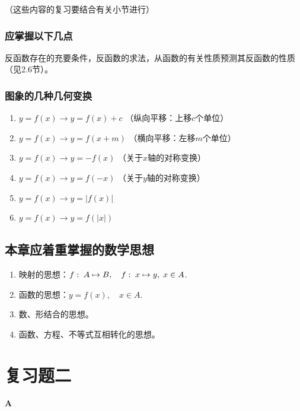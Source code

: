 （这些内容的复习要结合有关小节进行）

\subsubsection{应掌握以下几点}
反函数存在的充要条件，反函数的求法，从函数的有关性质预测其反函数的性质（见2.6节）。


\subsubsection{图象的几种几何变换}
\begin{enumerate}
    \item $y=f(x)\longrightarrow y=f(x)+c$
   \hfill （纵向平移：上移$c$个单位）
    \item $y=f(x)\longrightarrow y=f(x+m)$
    \hfill   （横向平移：左移$m$个单位）
    \item $y=f(x)\longrightarrow y=-f(x)$
    \hfill   （关于$x$轴的对称变换）
    \item $y=f(x)\longrightarrow y=f(-x)$
    \hfill    （关于$y$轴的对称变换）
    \item $y=f(x)\longrightarrow y=|f(x)|$
    \item $y=f(x)\longrightarrow y=f(|x|)$
\end{enumerate}

\subsection{本章应着重掌握的数学思想}
\begin{enumerate}
\item 映射的思想：$f:\; A\mapsto B,\quad f:\; x\mapsto y,\; x\in A$.
\item 函数的思想：$y=f(x),\quad x\in A$.
\item 数、形结合的思想。
\item 函数、方程、不等式互相转化的思想。
\end{enumerate}

\section*{复习题二}
\begin{center}
    \bfseries A
\end{center}

